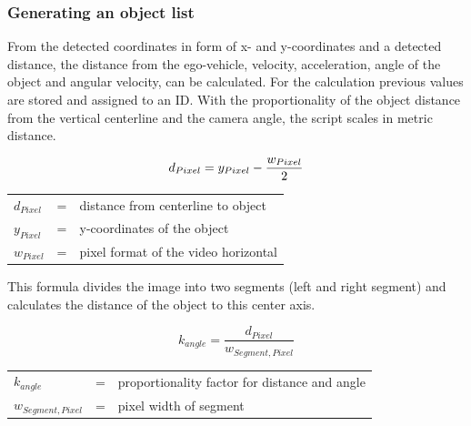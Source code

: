 \subsubsection{Generating an object list}
From the detected coordinates in form of x- and y-coordinates and a detected distance, the distance from the ego-vehicle, velocity, acceleration, angle of the object and angular velocity, can be calculated. For the calculation previous values are stored and assigned to an ID. With the proportionality of the object distance from the vertical centerline and the camera angle, the script scales in metric distance.


\begin{equation}
		d_{Pixel} = y_{Pixel} -  \frac{w_{Pixel}}{2}\\	
\end{equation}
\begin{table}[!h]
	\begin{center}
		\begin{tabular}{l c l}
			$d_{Pixel}$ & = & distance from centerline to object\\
			$y_{Pixel}$ & = &  y-coordinates of the object\\
			$w_{Pixel}$ & = & pixel format of the video horizontal\\
		\end{tabular}
	\end{center}
\end{table}



This formula divides the image into two segments (left and right segment) and calculates the distance of the object to this center axis.

\begin{equation}
k_{angle}  = \frac{d_{Pixel}}{w_{Segment,Pixel}}
\end{equation}
\begin{table}[!h]
	\begin{center}
		\begin{tabular}{l c l}
			$k_{angle}$ & = & proportionality factor for distance and angle\\
			$w_{Segment,Pixel}$ & = &  pixel width of segment\\
		\end{tabular}
	\end{center}
\end{table}

